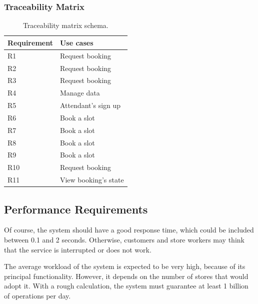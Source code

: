 \documentclass[table, 12pt]{article}
\begin{document}
\subsubsection{Traceability Matrix}
\begin{table}[H]
    \begin{center}
        \begin{tabular}{|l|l|}
            \hline
            \textbf{Requirement} & \textbf{Use cases}   \\
            \hline
            R1                   & Request booking      \\
            R2                   & Request booking      \\
            R3                   & Request booking      \\
            R4                   & Manage data          \\
            R5                   & Attendant's sign up  \\
            R6                   & Book a slot          \\
            R7                   & Book a slot          \\
            R8                   & Book a slot          \\
            R9                   & Book a slot          \\
            R10                  & Request booking      \\
            R11                  & View booking's state \\
            \hline
        \end{tabular}
        \caption{Traceability matrix schema.}
    \end{center}
\end{table}

\subsection{Performance Requirements}
Of course, the system should have a good response time, which could be included between 0.1 and 2 seconds.
Otherwise, customers and store workers may think that the service is interrupted or does not work.

The average workload of the system is expected to be very high, because of its principal functionality. However, it depends on the number of stores that would adopt it.
With a rough calculation, the system must guarantee at least 1 billion of operations per day.
\end{document}
